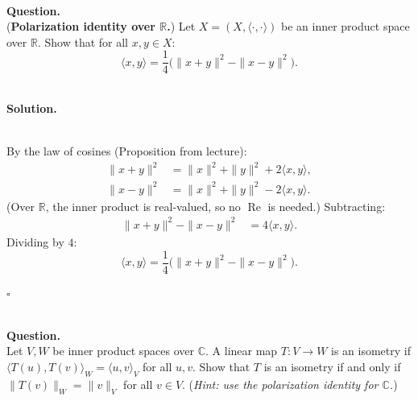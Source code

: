 \documentclass{article}
\begin{document}
\bigskip

\hfill \break  $~\!\!$ \dotfill \medskip \\
\textbf{Question.}\\
(\textbf{Polarization identity over $\mathbb{R}$.}) Let $X = (X, \langle \cdot, \cdot \rangle)$ be an inner product space over $\mathbb{R}$. Show that for all $x, y \in X$:
\[
\langle x, y \rangle = \frac{1}{4}\bigl(\|x+y\|^2 - \|x-y\|^2\bigr).
\]

\noindent\\
\textbf{Solution.}\\
\quad\\
\begin{mdframed}[linewidth=1pt]
By the law of cosines (Proposition from lecture):
\begin{align*}
\|x+y\|^2 &= \|x\|^2 + \|y\|^2 + 2\langle x, y \rangle, \\
\|x-y\|^2 &= \|x\|^2 + \|y\|^2 - 2\langle x, y \rangle.
\end{align*}
(Over $\mathbb{R}$, the inner product is real-valued, so no $\operatorname{Re}$ is needed.) Subtracting:
\begin{align*}
\|x+y\|^2 - \|x-y\|^2 &= 4\langle x, y \rangle.
\end{align*}
Dividing by $4$:
\[
\langle x, y \rangle = \frac{1}{4}\bigl(\|x+y\|^2 - \|x-y\|^2\bigr).
\]

\hfill $\square$
\end{mdframed}

\bigskip

\hfill \break  $~\!\!$ \dotfill \medskip \\
\textbf{Question.}\\
Let $V, W$ be inner product spaces over $\mathbb{C}$. A linear map $T: V \to W$ is an isometry if $\langle T(u), T(v) \rangle_W = \langle u, v \rangle_V$ for all $u, v$. Show that $T$ is an isometry if and only if $\|T(v)\|_W = \|v\|_V$ for all $v \in V$.
(\textit{Hint: use the polarization identity for $\mathbb{C}$.})
\end{document}
